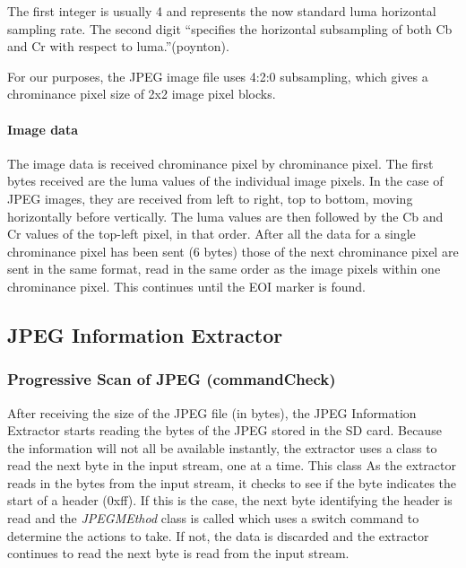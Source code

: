 The first integer is usually 4 and represents the now standard luma horizontal sampling rate. 
The second digit ``specifies the horizontal subsampling of both Cb and Cr with respect to luma.''(poynton).

For our purposes, the JPEG image file uses 4:2:0 subsampling, which gives a chrominance pixel size of 2x2 image pixel blocks.

\paragraph{Image data}

The image data is received chrominance pixel by chrominance pixel. 
The first bytes received are the luma values of the individual image pixels. 
In the case of JPEG images, they are received from left to right, top to bottom, moving horizontally before vertically. 
The luma values are then followed by the Cb and Cr values of the top-left pixel, in that order. 
After all the data for a single chrominance pixel has been sent (6 bytes) those of the next chrominance pixel are sent in the same format, 
read in the same order as the image pixels within one chrominance pixel. This continues until the EOI marker is found.


\subsection{JPEG Information Extractor}

\subsubsection{Progressive Scan of JPEG (commandCheck)}

After receiving the size of the JPEG file (in bytes), 
the JPEG Information Extractor starts reading the bytes of the JPEG stored in the SD card. 
Because the information will not all be available instantly, the extractor uses a class to read the next byte in the input stream, one at a time. 
This class %
As the extractor reads in the bytes from the input stream, it checks to see if the byte indicates the start of a header (0xff). 
If this is the case, the next byte identifying the header is read and 
the \emph{JPEGMEthod} class is called which uses a switch command to determine the actions to take. 
If not, the data is discarded and the extractor continues to read the next byte is read from the input stream. 

